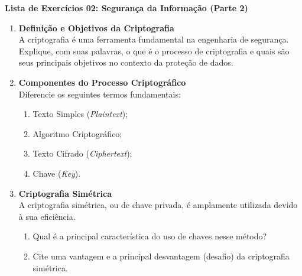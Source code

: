 \documentclass[12pt]{article}
\begin{document}
\begin{center}
    \textcolor{meuazul}{\huge \textbf{Lista de Exercícios 02: Segurança da Informação (Parte 2)}}
\end{center}

\vspace{1cm}

\begin{enumerate}[
    label=\textbf{Questão \arabic*:},
    leftmargin=2.8cm, %
    labelsep=0.3cm,   %
    align=left,
    labelwidth=2.5cm  %
]

    \item \textbf{Definição e Objetivos da Criptografia} \\
    A criptografia é uma ferramenta fundamental na engenharia de segurança. Explique, com suas palavras, o que é o processo de criptografia e quais são seus principais objetivos no contexto da proteção de dados.

    \vspace{0.4cm}

    \item \textbf{Componentes do Processo Criptográfico} \\
    Diferencie os seguintes termos fundamentais:
    \begin{enumerate}[label=\alph*), leftmargin=0.8cm, topsep=2pt]
        \item Texto Simples (\textit{Plaintext});
        \item Algoritmo Criptográfico;
        \item Texto Cifrado (\textit{Ciphertext});
        \item Chave (\textit{Key}).
    \end{enumerate}

    \vspace{0.4cm}

    \item \textbf{Criptografia Simétrica} \\
    A criptografia simétrica, ou de chave privada, é amplamente utilizada devido à sua eficiência.
    \begin{enumerate}[label=\alph*), leftmargin=0.8cm, topsep=2pt]
        \item Qual é a principal característica do uso de chaves nesse método?
        \item Cite uma vantagem e a principal desvantagem (desafio) da criptografia simétrica.
    \end{enumerate}


\end{enumerate}
\end{document}
